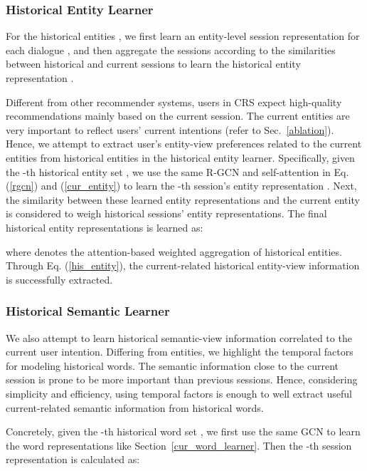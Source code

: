 \documentclass[sigconf,natbib=true]{acmart}
\begin{document}
\subsubsection{Historical Entity Learner}

For the historical entities , we first learn an entity-level session representation for each dialogue , and then aggregate the  sessions according to the similarities between historical and current sessions to learn the historical entity representation .

Different from other recommender systems, users in CRS expect high-quality recommendations mainly based on the current session. The current entities are very important to reflect users' current intentions (refer to Sec.~\ref{ablation}).
Hence, we attempt to extract user's entity-view preferences related to the current entities from historical entities in the historical entity learner.
Specifically, given the -th historical entity set , we use the same R-GCN and self-attention in Eq. (\ref{rgcn}) and (\ref{cur_entity}) to learn the -th session's entity representation .
Next, the similarity between these learned entity representations and the current entity  is considered to weigh  historical sessions' entity representations. The final historical entity representations  is learned as:

where  denotes the attention-based weighted aggregation of historical entities. Through Eq. (\ref{his_entity}), the current-related historical entity-view information is successfully extracted.


\subsubsection{Historical Semantic Learner}



We also attempt to learn historical semantic-view information correlated to the current user intention. Differing from entities, we highlight the temporal factors for modeling historical words. 
The semantic information close to the current session is prone to be more important than previous sessions. Hence,  considering simplicity and efficiency, using temporal factors is enough to well extract useful current-related semantic information from historical words.










Concretely, given the -th historical word set , we first use the same GCN to learn the word representations  like Section~\ref{cur_word_learner}. Then the -th session representation is calculated as:
\end{document}
